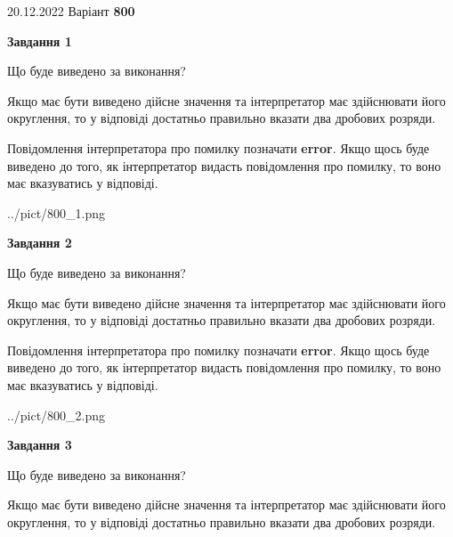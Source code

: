 \documentclass[12pt, ukrainian]{article}
\begin{document}
{20.12.2022 Варіант \No \textbf { 800 }\par}
{
\begin {Large}

{\begin {center}\textbf{Завдання 1}\end {center}}\par
Що буде виведено за виконання? \par

Якщо має бути виведено дійсне значення та інтерпретатор має здійснювати його округлення, 
то у відповіді достатньо правильно вказати два дробових розряди.

Повідомлення інтерпретатора про помилку позначати \textbf{error}.
Якщо щось буде виведено до того, як інтерпретатор видасть повідомлення про помилку, 
то воно має вказуватись у відповіді. \par

\begin{center}
	{../pict/800_1.png}
\end{center}
\newpage

{\begin {center}\textbf{Завдання 2}\end {center}}\par
Що буде виведено за виконання? \par

Якщо має бути виведено дійсне значення та інтерпретатор має здійснювати його округлення, 
то у відповіді достатньо правильно вказати два дробових розряди.

Повідомлення інтерпретатора про помилку позначати \textbf{error}.
Якщо щось буде виведено до того, як інтерпретатор видасть повідомлення про помилку, 
то воно має вказуватись у відповіді. \par

\begin{center}
	{../pict/800_2.png}
\end{center}
\newpage

{\begin {center}\textbf{Завдання 3}\end {center}}\par
Що буде виведено за виконання? \par

Якщо має бути виведено дійсне значення та інтерпретатор має здійснювати його округлення, 
то у відповіді достатньо правильно вказати два дробових розряди.


\end{Large}}
\end{document}
